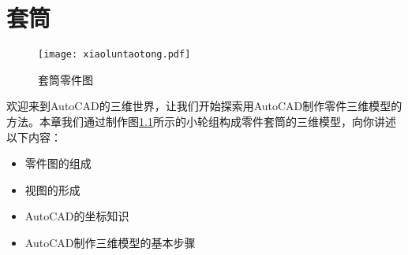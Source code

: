 \chapter{套筒}
\begin{figure}[htbp]
\centering
\texttt{[image: xiaoluntaotong.pdf]}
\caption{套筒零件图}\label{fig:xiaoluntaotong}
\end{figure}

欢迎来到AutoCAD的三维世界，让我们开始探索用AutoCAD制作零件三维模型的方法。本章我们通过制作图\ref{fig:xiaoluntaotong}所示的小轮组构成零件套筒的三维模型，向你讲述以下内容：
\begin{itemize}
	\item 零件图的组成
	\item 视图的形成
	\item AutoCAD的坐标知识
	\item AutoCAD制作三维模型的基本步骤
\end{itemize}


\endinput